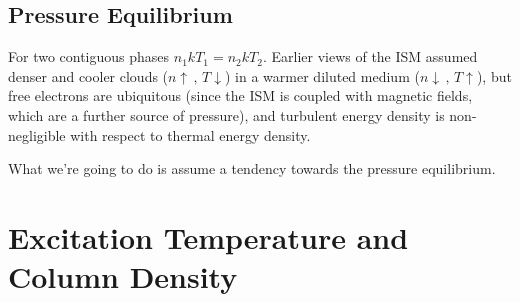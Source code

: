 \subsection{Pressure Equilibrium}

For two contiguous phases $n_{1}kT_{1} = n_{2}kT_{2}$. Earlier views of the ISM assumed denser and cooler clouds ($n\uparrow\,,\,T\downarrow$) in a warmer diluted medium ($n\downarrow\,,\,T\uparrow$), but free electrons are ubiquitous (since the ISM is coupled with magnetic fields, which are a further source of pressure), and turbulent energy density is non-negligible with respect to thermal energy density.
\par What we're going to do is assume a tendency towards the pressure equilibrium.

\section{Excitation Temperature and Column Density}

